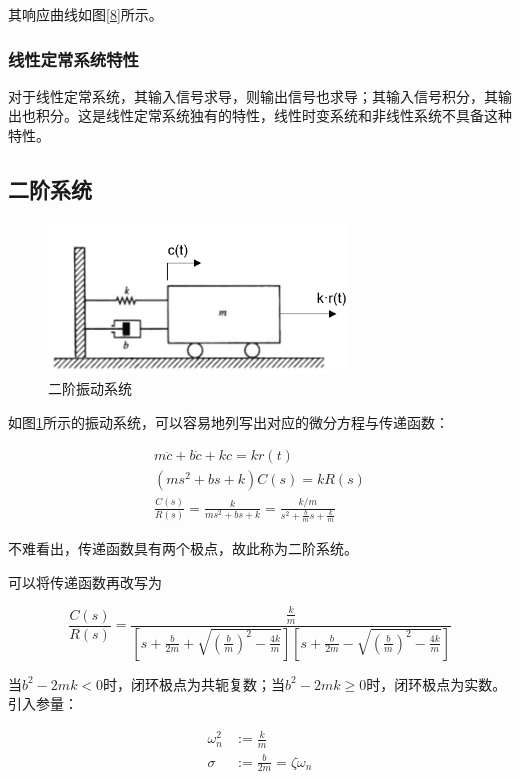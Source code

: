 其响应曲线如图\ref{8}所示。

\subsubsection{线性定常系统特性}

对于线性定常系统，其输入信号求导，则输出信号也求导；其输入信号积分，其输出也积分。这是线性定常系统独有的特性，线性时变系统和非线性系统不具备这种特性。

\subsection{二阶系统}

\begin{figure}[!ht]
	\centering
	\includegraphics[width=8cm]{figures/9.png}
	\caption{二阶振动系统}
	\label{9}
\end{figure}

如图\ref{9}所示的振动系统，可以容易地列写出对应的微分方程与传递函数：

\begin{gather*}
m\ddot c+b\dot c+kc=kr(t)\\
(ms^2+bs+k)C(s)=kR(s)\\
\frac{C(s)}{R(s)}=\frac{k}{ms^2+bs+k}=\frac{k/m}{s^2+\frac{b}{m}s+\frac{k}{m}}
\end{gather*}

不难看出，传递函数具有两个极点，故此称为二阶系统。

可以将传递函数再改写为

\begin{equation*}
\frac{C(s)}{R(s)}=\frac{\frac{k}{m}}{\left[s+\frac{b}{2m}+\sqrt{(\frac{b}{m})^2-\frac{4k}{m}}\right]\left[s+\frac{b}{2m}-\sqrt{(\frac{b}{m})^2-\frac{4k}{m}}\right]}
\end{equation*}

当$b^2-2mk<0$时，闭环极点为共轭复数；当$b^2-2mk\ge0$时，闭环极点为实数。引入参量：

\begin{align*}
\omega_n^2&:=\frac{k}{m}\\
\sigma&:=\frac{b}{2m}=\zeta\omega_n
\end{align*}

